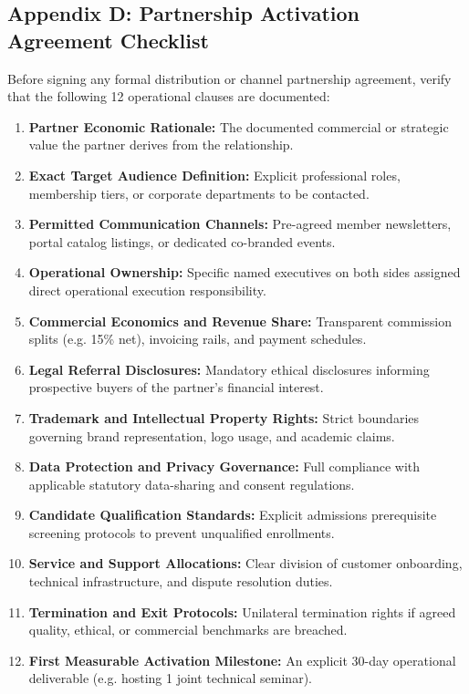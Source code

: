 \subsection*{Appendix D: Partnership Activation Agreement Checklist}

Before signing any formal distribution or channel partnership agreement, verify that the following 12 operational clauses are documented:
\begin{enumerate}[leftmargin=*,itemsep=1pt]
  \item \textbf{Partner Economic Rationale:} The documented commercial or strategic value the partner derives from the relationship.
  \item \textbf{Exact Target Audience Definition:} Explicit professional roles, membership tiers, or corporate departments to be contacted.
  \item \textbf{Permitted Communication Channels:} Pre-agreed member newsletters, portal catalog listings, or dedicated co-branded events.
  \item \textbf{Operational Ownership:} Specific named executives on both sides assigned direct operational execution responsibility.
  \item \textbf{Commercial Economics and Revenue Share:} Transparent commission splits (e.g. 15\% net), invoicing rails, and payment schedules.
  \item \textbf{Legal Referral Disclosures:} Mandatory ethical disclosures informing prospective buyers of the partner's financial interest.
  \item \textbf{Trademark and Intellectual Property Rights:} Strict boundaries governing brand representation, logo usage, and academic claims.
  \item \textbf{Data Protection and Privacy Governance:} Full compliance with applicable statutory data-sharing and consent regulations.
  \item \textbf{Candidate Qualification Standards:} Explicit admissions prerequisite screening protocols to prevent unqualified enrollments.
  \item \textbf{Service and Support Allocations:} Clear division of customer onboarding, technical infrastructure, and dispute resolution duties.
  \item \textbf{Termination and Exit Protocols:} Unilateral termination rights if agreed quality, ethical, or commercial benchmarks are breached.
  \item \textbf{First Measurable Activation Milestone:} An explicit 30-day operational deliverable (e.g. hosting 1 joint technical seminar).
\end{enumerate}
